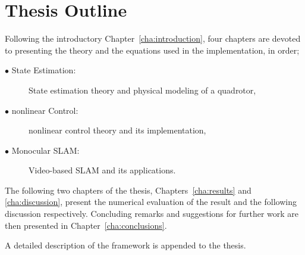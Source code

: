 \section{Thesis Outline}
    Following the introductory Chapter~\ref{cha:introduction}, four chapters
    are devoted to presenting the theory and the equations used in the implementation, in order;
    \begin{description}
        \item[$\bullet$ State Estimation:] State estimation theory and physical modeling of a quadrotor,
        \item[$\bullet$ nonlinear Control:]  nonlinear control theory and its implementation,
        \item[$\bullet$ Monocular SLAM:] Video-based SLAM and its applications.
    \end{description}

    The following two chapters of the thesis, Chapters~\ref{cha:results} and \ref{cha:discussion}, present the
    numerical evaluation of the result and the following discussion respectively.
    Concluding remarks and suggestions for further work are then presented in Chapter~\ref{cha:conclusions}.

    A detailed description of the \crap framework is appended to the thesis.
